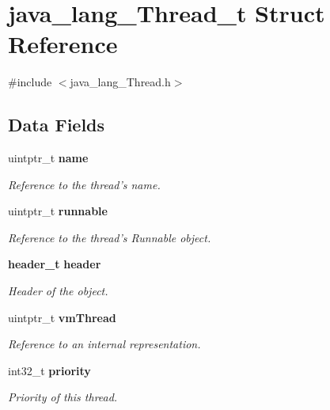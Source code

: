 \section{java\_\-lang\_\-Thread\_\-t Struct Reference}
\label{structjava__lang___thread__t}


{\ttfamily \#include $<$java\_\-lang\_\-Thread.h$>$}

\subsection*{Data Fields}
\begin{DoxyCompactItemize}
\item 
uintptr\_\-t {\bf name}\label{structjava__lang___thread__t_aa6c3392f6ce4a09d1110a67fc3766fa5}

\begin{DoxyCompactList}\small\item\em Reference to the thread's name. \item\end{DoxyCompactList}\item 
uintptr\_\-t {\bf runnable}\label{structjava__lang___thread__t_a3376a42552d86804c76d959b1ae8f3ea}

\begin{DoxyCompactList}\small\item\em Reference to the thread's Runnable object. \item\end{DoxyCompactList}\item 
{\bf header\_\-t} {\bf header}\label{structjava__lang___thread__t_a732f3483c56c6c203485422b0b9a8f28}

\begin{DoxyCompactList}\small\item\em Header of the object. \item\end{DoxyCompactList}\item 
uintptr\_\-t {\bf vmThread}\label{structjava__lang___thread__t_a967f9f5c533399e13ef6d60a83a0ce2c}

\begin{DoxyCompactList}\small\item\em Reference to an internal representation. \item\end{DoxyCompactList}\item 
int32\_\-t {\bf priority}\label{structjava__lang___thread__t_a799280c13e3391475f7552c3f0cabf14}

\begin{DoxyCompactList}\small\item\em Priority of this thread. \item\end{DoxyCompactList}\end{DoxyCompactItemize}



